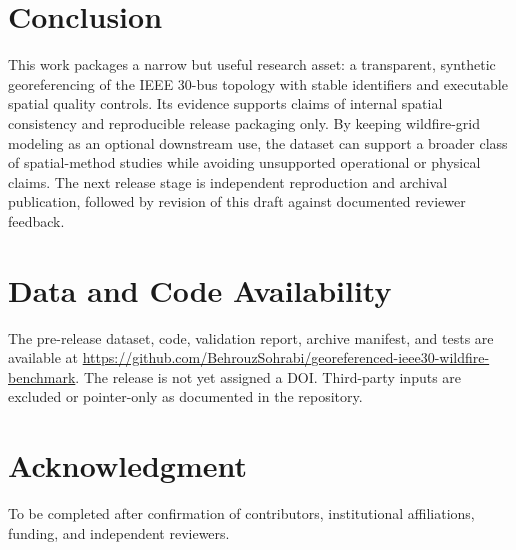 \documentclass[10pt,journal]{IEEEtran}
\begin{document}
\section{Conclusion}
This work packages a narrow but useful research asset: a transparent, synthetic georeferencing of the IEEE 30-bus topology with stable identifiers and executable spatial quality controls. Its evidence supports claims of internal spatial consistency and reproducible release packaging only. By keeping wildfire-grid modeling as an optional downstream use, the dataset can support a broader class of spatial-method studies while avoiding unsupported operational or physical claims. The next release stage is independent reproduction and archival publication, followed by revision of this draft against documented reviewer feedback.

\section*{Data and Code Availability}
The pre-release dataset, code, validation report, archive manifest, and tests are available at \url{https://github.com/BehrouzSohrabi/georeferenced-ieee30-wildfire-benchmark}. The release is not yet assigned a DOI. Third-party inputs are excluded or pointer-only as documented in the repository.

\section*{Acknowledgment}
To be completed after confirmation of contributors, institutional affiliations, funding, and independent reviewers.



\end{document}
